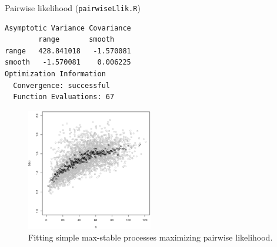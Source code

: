 \documentclass[mode=present,style=simple,paper=screen]{powerdot}
\theoremstyle{plain}%
\theoremstyle{definition}
\theoremstyle{remark}
\begin{document}
\begin{wideslide}[toc=Pairwise likelihood,method=file]{Pairwise
    likelihood (\texttt{pairwiseLlik.R}) \citep{Padoan2010}}
\begin{minipage}[l]{.33\linewidth}
{\begin{verbatim}
Asymptotic Variance Covariance
        range       smooth
range   428.841018   -1.570081
smooth   -1.570081    0.006225
Optimization Information
  Convergence: successful
  Function Evaluations: 67
\end{verbatim}
}
  \end{minipage}
  \hfill
  \begin{minipage}[r]{.6\linewidth}
    \begin{figure}
      \centering
      \includegraphics[width=0.49\textwidth]{Figures/empExtCoeffRain}%
      \caption{Fitting simple max-stable processes maximizing pairwise
        likelihood.}
      \label{fig:pairLlik}
    \end{figure}
  \end{minipage}
\end{wideslide}
\end{document}
